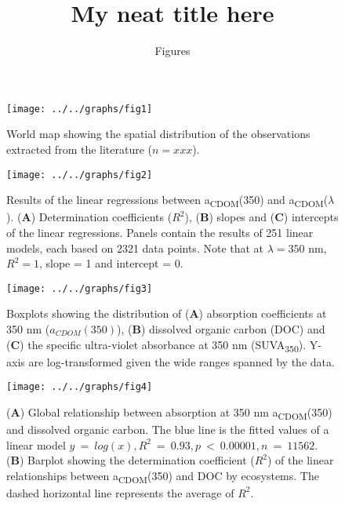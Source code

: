 \documentclass[10pt,a4paper]{scrartcl}
\title{My neat title here}
\subtitle{Figures}
\date{}
\begin{document}
\maketitle

\begin{figure}[h]
	\centering
	\texttt{[image: ../../graphs/fig1]}
	\caption{World map showing the spatial distribution of the observations extracted from the literature ($n = xxx$).}
\end{figure}

\clearpage
\newpage

\begin{figure}[h]
	\centering
	\texttt{[image: ../../graphs/fig2]}
	\caption{Results of the linear regressions between a\textsubscript{CDOM}(350) and a\textsubscript{CDOM}($\lambda$). (\textbf{A}) Determination coefficients ($R^2$), (\textbf{B}) slopes and (\textbf{C}) intercepts of the linear regressions. Panels contain the results of 251 linear models, each based on 2321 data points. Note that at $\lambda = 350$ nm, $R^2 = 1$, slope = 1 and intercept = 0.}
\end{figure}

\clearpage
\newpage

\begin{figure}[h]
	\centering
	\texttt{[image: ../../graphs/fig3]}
	\caption{Boxplots showing the distribution of (\textbf{A}) absorption coefficients at 350 nm ($a_{CDOM}(350)$), (\textbf{B}) dissolved organic carbon (DOC) and (\textbf{C}) the specific ultra-violet absorbance at 350 nm (SUVA\textsubscript{350}). Y-axis are log-transformed given the wide ranges spanned by the data.}
\end{figure}

\clearpage
\newpage

\begin{figure}[h]
	\centering
	\texttt{[image: ../../graphs/fig4]}
	\caption{(\textbf{A}) Global relationship between absorption at 350 nm a\textsubscript{CDOM}(350) and dissolved organic carbon. The blue line is the fitted values of a linear model $y~=~log(x), R^2~=~0.93, p~<~0.00001, n~=~11562$. (\textbf{B}) Barplot showing the determination coefficient ($R^2$) of the linear relationships between a\textsubscript{CDOM}(350) and DOC by ecosystems. The dashed horizontal line represents the average of $R^2$.}
\end{figure}

\clearpage
\newpage
\end{document}
